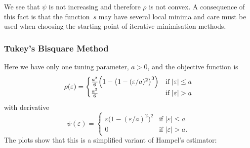 \documentclass[
  a4paper,
]{article}
\theoremstyle{definition}
\theoremstyle{definition}
\theoremstyle{definition}
\theoremstyle{definition}
\theoremstyle{remark}
\begin{document}
We see that \(\psi\) is not increasing and therefore \(\rho\) is not convex. A
consequence of this fact is that the function~\(s\) may have several local minima
and care must be used when choosing the starting point of iterative
minimisation methods.

\subsubsection{Tukey's Bisquare Method}\label{bisquare}

Here we have only one tuning parameter, \(a > 0\), and the objective
function is
\begin{equation*}
  \rho(\varepsilon)
  = \begin{cases}
  \frac{a^2}{6} \Bigl( 1 - \bigl( 1 - (\varepsilon/a)^2 \bigr)^3 \Bigr)
                & \mbox{if } |\varepsilon| \leq a \\
  \frac{a^2}{6} & \mbox{if } |\varepsilon| > a
  \end{cases}
\end{equation*}
with derivative
\begin{equation*}
  \psi(\varepsilon)
  = \begin{cases}
  \varepsilon\bigl( 1 - (\varepsilon/a)^2 \bigr)^2
        & \mbox{if } |\varepsilon| \leq a \\
      0 & \mbox{if } |\varepsilon| > a.
  \end{cases}
\end{equation*}
The plots show that this is a simplified variant of Hampel's
estimator:
\end{document}
